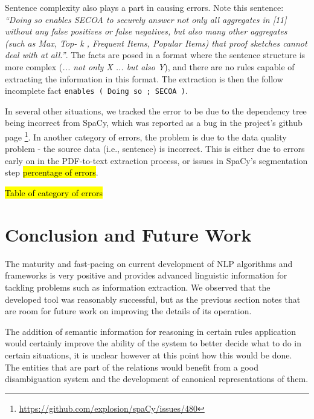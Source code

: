 \documentclass[11pt,a4paper,openright]{memoir}
\begin{document}
Sentence complexity also plays a part in causing errors. Note this sentence: \emph{\enquote{Doing so enables SECOA to securely answer not only all aggregates in [11] without any false positives or false negatives, but also many other aggregates (such as Max, Top- k , Frequent Items, Popular Items) that proof sketches cannot deal with at all.}}. The facts are posed in a format where the sentence structure is more complex (\emph{... not only X ... but also Y}), and there are no rules capable of extracting the information in this format. The extraction is then the follow incomplete fact \texttt{enables	( Doing so ; SECOA )}.

In several other situations, we tracked the error to be due to the dependency tree being incorrect from SpaCy, which was reported as a bug in the project's github page \footnote{\url{https://github.com/explosion/spaCy/issues/480}}. In another category of errors, the problem is due to the data quality problem - the source data (i.e., sentence) is incorrect. This is either due to errors early on in the PDF-to-text extraction process, or issues in SpaCy's segmentation step \hl{percentage of errors}.

\hl{Table of category of errors}


%
%
%
%


\chapter{Conclusion and Future Work}
\label{chapter:conclusion}

The maturity and fast-pacing on current development of NLP algorithms and frameworks is very positive and provides advanced linguistic information for tackling problems such as information extraction. We observed that the developed tool was reasonably successful, but as the previous section notes that are room for future work on improving the details of its operation.

The addition of semantic information for reasoning in certain rules application would certainly improve the ability of the system to better decide what to do in certain situations, it is unclear however at this point how this would be done. The entities that are part of the relations would benefit from a good disambiguation system and the development of canonical representations of them.
\end{document}
